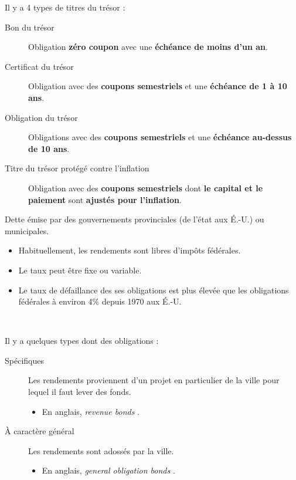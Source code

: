 \documentclass[10pt, french]{article}
\begin{document}
\begin{multicols*}{2}
\begin{definitionNOHFILLprop}
Il y a 4 types de titres du trésor :
\begin{description}
	\item[Bon du trésor]	Obligation \textbf{zéro coupon} avec une \textbf{échéance de moins d'un an}.
	\item[Certificat du trésor]	Obligation avec des \textbf{coupons semestriels} et une \textbf{échéance de 1 à 10 ans}.
	\item[Obligation du trésor]		Obligations avec des \textbf{coupons semestriels} et une \textbf{échéance au-dessus de 10 ans}.
	\item[Titre du trésor protégé contre l'inflation]	Obligation avec des \textbf{coupons semestriels} dont \textbf{le capital et le paiement} sont \textbf{ajustés pour l'inflation}.
\end{description}
\end{definitionNOHFILLprop}

\begin{definitionNOHFILLprop}
Dette émise par des gouvernements provinciales (de l'état aux É.-U.) ou municipales.

\begin{itemize}
	\item	Habituellement, les rendements sont libres d'impôts fédérales.
	\item	Le taux peut être fixe ou variable.
	\item	Le taux de défaillance des ses obligations est plus élevée que les obligations fédérales à environ 4\% depuis 1970 aux É.-U.
\end{itemize}

\

Il y a quelques types dont des obligations : 
\begin{description}
	\item[Spécifiques]	Les rendements proviennent d'un projet en particulier de la ville pour lequel il faut lever des fonds.
		\begin{itemize}
		\item	En anglais, \og \textit{revenue bonds} \fg{}.
		\end{itemize}
	\item[À caractère général]	Les rendements sont adossés par la ville.
		\begin{itemize}
		\item	En anglais, \og \textit{general obligation bonds} \fg{}.
		\end{itemize}
\end{description}
\end{definitionNOHFILLprop}


\end{multicols*}
\end{document}
